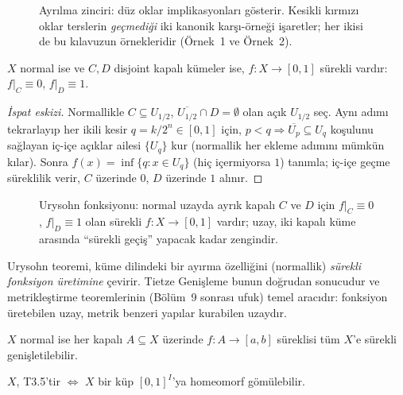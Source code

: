 \begin{figure}[ht]
  \centering
  
  \caption{Ayrılma zinciri: düz oklar implikasyonları gösterir.
    Kesikli kırmızı oklar terslerin \emph{geçmediği} iki kanonik
    karşı-örneği işaretler; her ikisi de bu kılavuzun örnekleridir
    (Örnek~1 ve Örnek~2).}
  \label{fig:ch06:zincir}
\end{figure}

\begin{theorem}
$X$ normal ise ve $C, D$ disjoint kapalı kümeler ise, $f: X \to [0,1]$ sürekli vardır:
$f|_C \equiv 0$, $f|_D \equiv 1$.
\end{theorem}

\begin{proof}[İspat eskizi]
Normallikle $C \subseteq U_{1/2}$, $\overline{U_{1/2}} \cap D = \emptyset$
olan açık $U_{1/2}$ seç. Aynı adımı tekrarlayıp her ikili kesir
$q = k/2^n \in [0,1]$ için, $p < q \Rightarrow \overline{U_p} \subseteq U_q$
koşulunu sağlayan iç-içe açıklar ailesi $\{U_q\}$ kur (normallik her ekleme
adımını mümkün kılar). Sonra $f(x) = \inf\{q : x \in U_q\}$ (hiç içermiyorsa
$1$) tanımla; iç-içe geçme süreklilik verir, $C$ üzerinde $0$, $D$ üzerinde
$1$ alınır.
\end{proof}

\begin{figure}[ht]
  \centering
  
  \caption{Urysohn fonksiyonu: normal uzayda ayrık kapalı $C$ ve $D$
    için $f|_C\equiv 0$, $f|_D\equiv 1$ olan sürekli $f:X\to[0,1]$
    vardır; uzay, iki kapalı küme arasında ``sürekli geçiş'' yapacak
    kadar zengindir.}
  \label{fig:ch06:urysohn}
\end{figure}

\begin{nedenonemli}
Urysohn teoremi, küme dilindeki bir ayırma özelliğini (normallik)
\emph{sürekli fonksiyon üretimine} çevirir. Tietze Genişleme bunun
doğrudan sonucudur ve metrikleştirme teoremlerinin (Bölüm~9 sonrası
ufuk) temel aracıdır: fonksiyon üretebilen uzay, metrik benzeri
yapılar kurabilen uzaydır.
\end{nedenonemli}

\begin{theorem}
$X$ normal ise her kapalı $A \subseteq X$ üzerinde $f: A \to [a,b]$ süreklisi
tüm $X$'e sürekli genişletilebilir.
\end{theorem}

\begin{theorem}
$X$, T3.5'tir $\iff$ $X$ bir küp $[0,1]^I$'ya homeomorf gömülebilir.
\end{theorem}

